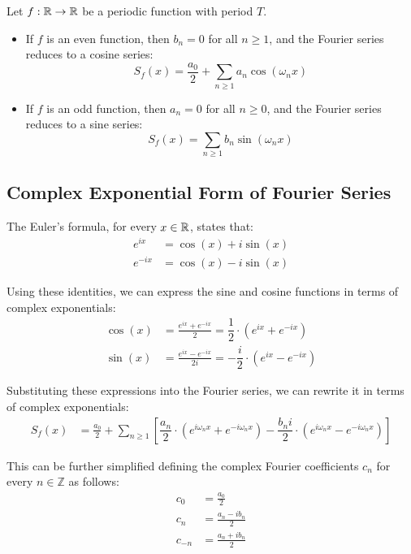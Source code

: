\begin{prop}
    Let $f:\mathbb{R}\to \mathbb{R}$ be a periodic function with period $T$.
    \begin{itemize}
        \item If $f$ is an even function, then $b_n = 0$ for all $n\geq 1$, and the Fourier series reduces to a cosine series:
        \[
            S_f(x) = \frac{a_0}{2} + \sum\limits_{n\geq 1} a_n \cos\left(\omega_n x\right)
        \]
        \item If $f$ is an odd function, then $a_n = 0$ for all $n\geq 0$, and the Fourier series reduces to a sine series:
        \[
            S_f(x) = \sum\limits_{n\geq 1} b_n \sin\left(\omega_n x\right)
        \]
    \end{itemize}
\end{prop}


\subsection{Complex Exponential Form of Fourier Series}

The Euler's formula, for every $x\in \mathbb{R}$, states that:
\begin{align*}
    e^{ix} &= \cos(x) + i\sin(x)\\
    e^{-ix} &= \cos(x) - i\sin(x)
\end{align*}

Using these identities, we can express the sine and cosine functions in terms of complex exponentials:
\begin{align*}
    \cos(x) &= \frac{e^{ix} + e^{-ix}}{2} = \dfrac{1}{2}\cdot \left(e^{ix} + e^{-ix}\right)\\
    \sin(x) &= \frac{e^{ix} - e^{-ix}}{2i} = -\dfrac{i}{2}\cdot \left(e^{ix} - e^{-ix}\right)
\end{align*}

Substituting these expressions into the Fourier series, we can rewrite it in terms of complex exponentials:
\begin{align*}
    S_f(x) &= \frac{a_0}{2} + \sum\limits_{n\geq 1} \left[\dfrac{a_n}{2}\cdot \left(e^{i\omega_n x} + e^{-i\omega_n x}\right) - \dfrac{b_n i}{2}\cdot \left(e^{i\omega_n x} - e^{-i\omega_n x}\right)\right]
\end{align*}

This can be further simplified defining the complex Fourier coefficients $c_n$ for every $n\in \mathbb{Z}$ as follows:
\begin{align*}
    c_0 &= \frac{a_0}{2} \\
    c_n &= \frac{a_n - i b_n}{2} \\
    c_{-n} &= \frac{a_n + i b_n}{2}
\end{align*}

